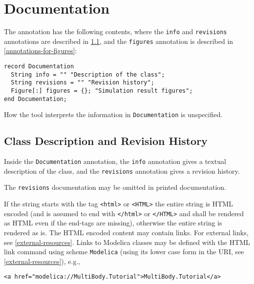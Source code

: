 \section{Documentation}\label{annotations-for-documentation}\label{documentation}

The  annotation has the following contents, where the \lstinline!info! and \lstinline!revisions! annotations are described in \cref{annotation-info-revisions}, and the \lstinline!figures! annotation is described in \cref{annotations-for-figures}:
\begin{lstlisting}[language=modelica]
record Documentation
  String info = "" "Description of the class";
  String revisions = "" "Revision history";
  Figure[:] figures = {}; "Simulation result figures";
end Documentation;
\end{lstlisting}

How the tool interprets the information in \lstinline!Documentation! is unspecified.

\subsection{Class Description and Revision History}\label{annotation-info-revisions}

Inside the \lstinline!Documentation! annotation, the \lstinline!info! annotation gives a textual description of the class, and the \lstinline!revisions! annotation gives a revision history.

\begin{nonnormative}
The \lstinline!revisions! documentation may be omitted in printed documentation.
\end{nonnormative}

If the string starts with the tag \lstinline!<html>! or \lstinline!<HTML>! the entire string is HTML encoded (and is assumed to end with \lstinline!</html>! or \lstinline!</HTML>! and shall be rendered as HTML even if the end-tags are missing), otherwise the entire string is rendered as is.
The HTML encoded content may contain links.
For external links, see \cref{external-resources}.
Links to Modelica classes may be defined with the HTML link command using scheme \lstinline!Modelica! (using its lower case form in the URI, see \cref{external-resources}), e.g.,
\begin{lstlisting}[language=modelica]
<a href="modelica://MultiBody.Tutorial">MultiBody.Tutorial</a>
\end{lstlisting}

